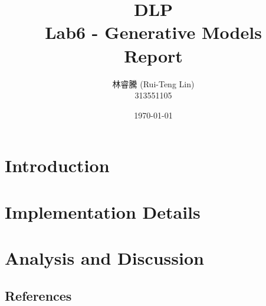 \documentclass[11pt]{article}
\title{DLP\\ Lab6 - Generative Models\\Report}
\author{林睿騰 (Rui-Teng Lin)\\
313551105}
\date{\today}
\begin{document}
\begin{CJK*}{UTF8}{bsmi}  %
    \maketitle



    \newpage

    \tableofcontents

    \newpage

    \section{Introduction}
    

    \section{Implementation Details}
    

    \section{Analysis and Discussion}
    

    \begin{appendices}
        \section{References}
        
    \end{appendices}



\end{CJK*}  %
\end{document}

